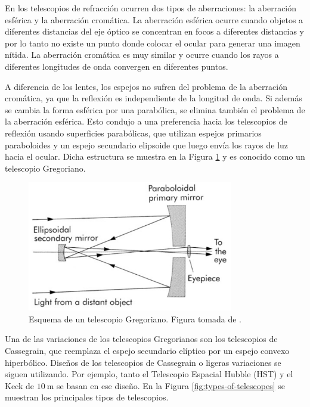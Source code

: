 En los telescopios de refracción ocurren dos tipos de aberraciones: la aberración esférica y la aberración cromática. La aberración esférica ocurre cuando objetos a diferentes distancias del eje óptico se concentran en focos a diferentes distancias y por lo tanto no existe un punto donde colocar el ocular para generar una imagen nítida. La aberración cromática es muy similar y ocurre cuando los rayos a diferentes longitudes de onda convergen en diferentes puntos. 

A diferencia de los lentes, los espejos no sufren del problema de la aberración cromática, ya que la reflexión es independiente de la longitud de onda. Si además se cambia la forma esférica por una parabólica, se elimina también el problema de la aberración esférica. Esto condujo a una preferencia hacia los telescopios de reflexión usando superficies parabólicas, que utilizan espejos primarios paraboloides y un espejo secundario elipsoide que luego envía los rayos de luz hacia el ocular. Dicha estructura se muestra en la Figura \ref{fig:paraboloidal-telescope} y es conocido como un telescopio Gregoriano.

\begin{figure}[htb]
  \centering
	\includegraphics[width=0.8\textwidth]{figures/paraboloidal-telescope.png}
	\caption{Esquema de un telescopio Gregoriano. Figura tomada de \citet{kitchin2013telescopes}.}
	\label{fig:paraboloidal-telescope} 
\end{figure}

Una de las variaciones de los telescopios Gregorianos son los telescopios de Cassegrain, que reemplaza el espejo secundario elíptico por un espejo convexo hiperbólico. Diseños de los telescopios de Cassegrain o ligeras variaciones se siguen utilizando. Por ejemplo, tanto el Telescopio Espacial Hubble (HST) y el Keck de $ 10 \mathrm{~m} $ se basan en ese diseño. En la Figura \ref{fig:types-of-telescopes} se muestran los principales tipos de telescopios.

